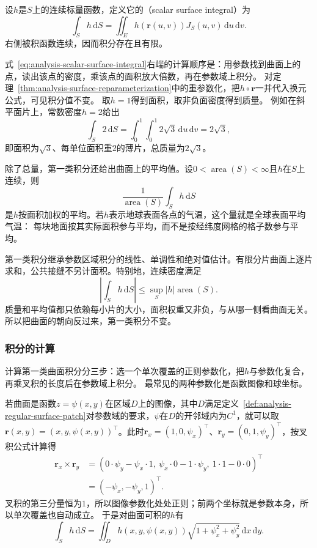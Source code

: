 \begin{definition}[第一类曲面积分]
\label{def:analysis-scalar-surface-integral}
设$h$是$S$上的连续标量函数，定义它的（scalar surface integral）为
\begin{equation}
 \int_Sh\,\mathrm dS
 =\iint_Eh(\bm r(u,v))J_S(u,v)\,\mathrm du\,\mathrm dv.
 \label{eq:analysis-scalar-surface-integral}
\end{equation}
右侧被积函数连续，因而积分存在且有限。
\end{definition}

式~\eqref{eq:analysis-scalar-surface-integral}右端的计算顺序是：用参数找到曲面上的点，读出该点的密度，乘该点的面积放大倍数，再在参数域上积分。
对定理~\ref{thm:analysis-surface-reparameterization}中的重参数化，把$h\circ\bm r$一并代入换元公式，可见积分值不变。
取$h=1$得到面积，取非负面密度得到质量。
例如在斜平面片上，常数密度$h=2$给出
\[
 \int_S2\,\mathrm dS=\int_0^1\int_0^1 2\sqrt3\,\mathrm du\,\mathrm dv=2\sqrt3,
\]
即面积为$\sqrt3$、每单位面积重$2$的薄片，总质量为$2\sqrt3$。

除了总量，第一类积分还给出曲面上的平均值。设$0<\operatorname{area}(S)<\infty$且$h$在$S$上连续，则
\[
 \frac1{\operatorname{area}(S)}\int_Sh\,\mathrm dS
\]
是$h$按面积加权的平均。若$h$表示地球表面各点的气温，这个量就是全球表面平均气温：
每块地面按其实际面积参与平均，而不是按经纬度网格的格子数参与平均。

第一类积分继承参数区域积分的线性、单调性和绝对值估计。有限分片曲面上逐片求和，公共接缝不另计面积。特别地，连续密度满足
\[
 \left|\int_S h\,\mathrm dS\right|\leq\sup_S|h|\operatorname{area}(S).
\]
质量和平均值都只依赖每小片的大小，面积权重又非负，与从哪一侧看曲面无关。所以把曲面的朝向反过来，第一类积分不变。

\subsubsection{积分的计算}

计算第一类曲面积分分三步：选一个单次覆盖的正则参数化，把$h$与参数化复合，再乘叉积的长度后在参数域上积分。
最常见的两种参数化是函数图像和球坐标。

若曲面是函数$z=\psi(x,y)$在区域$D$上的图像，其中$D$满足定义~\ref{def:analysis-regular-surface-patch}对参数域的要求，$\psi$在$D$的开邻域内为$C^1$，就可以取
$\bm r(x,y)=(x,y,\psi(x,y))^\top$。此时$\bm r_x=(1,0,\psi_x)^\top$、$\bm r_y=(0,1,\psi_y)^\top$，按叉积公式计算得
\[
 \begin{aligned}
 \bm r_x\times\bm r_y
 &=(0\cdot\psi_y-\psi_x\cdot1,\ \psi_x\cdot0-1\cdot\psi_y,\ 1\cdot1-0\cdot0)^\top\\
 &=(-\psi_x,-\psi_y,1)^\top.
 \end{aligned}
\]
叉积的第三分量恒为$1$，所以图像参数化处处正则；前两个坐标就是参数本身，所以单次覆盖也自动成立。
于是对曲面可积的$h$有
\[
 \int_Sh\,\mathrm dS
 =\iint_Dh(x,y,\psi(x,y))\sqrt{1+\psi_x^2+\psi_y^2}\,\mathrm dx\,\mathrm dy.
\]

